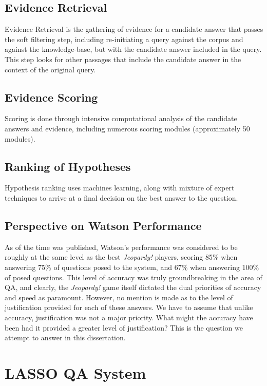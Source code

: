 \subsection{Evidence Retrieval}

Evidence Retrieval is the gathering of evidence for a candidate answer that passes the soft filtering step, including re-initiating a query against the corpus and against the knowledge-base, but with the candidate answer included in the query.  This step looks for other passages that include the candidate answer in the context of the original query.

\subsection{Evidence Scoring}

Scoring is done through intensive computational analysis of the candidate answers and evidence, including numerous scoring modules (approximately 50 modules).

\subsection{Ranking of Hypotheses}

Hypothesis ranking uses machines learning, along with mixture of expert techniques to arrive at a final
decision on the best answer to the question.

\subsection{Perspective on Watson Performance}

As of the time \cite{ferrucci2010building} was published, Watson's performance was considered to be roughly at the same level as the best \textit{Jeopardy!} players, scoring 85\% when answering 75\% of questions posed to the system, and 67\% when answering 100\% of posed questions.  This level of accuracy was truly groundbreaking in the area of QA, and clearly, the \textit{Jeopardy!} game itself dictated the dual priorities of accuracy and speed as paramount.  However, no mention is made as to the level of justification provided for each of these answers.  We have to assume that unlike accuracy, justification was not a major priority.  What might the accuracy have been had it provided a greater level of justification?  This is the question we attempt to answer in this dissertation.

\section{LASSO QA System}

